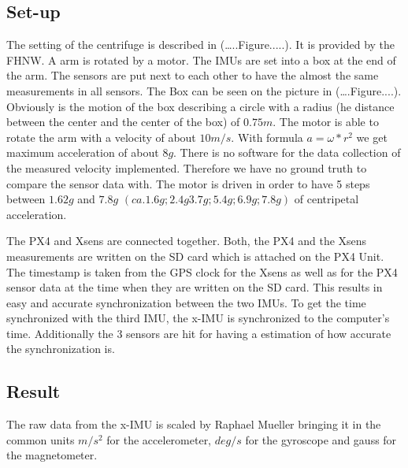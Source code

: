 \begin{description}
\subsection{Set-up}
The setting of the centrifuge is described in (…..Figure.....). It is provided by the FHNW. A arm is rotated by a motor. The IMUs are set into a box at the end of the arm. The sensors are put next to each other to have the almost the same measurements in all sensors. The Box can be seen on the picture in (….Figure....). Obviously is the motion of the box describing a circle with a radius (he distance between the center and the  center of the box) of $0.75 m$. The motor is able to rotate the arm with a velocity of about $10 m/s$. With formula $a=\omega*r^2$ we get maximum acceleration of about $8 g$. There is no software for the data collection of the measured velocity implemented. Therefore we have no ground truth to compare the sensor data with. The motor is driven in order to have 5 steps between $1.62 g$ and $7.8 g$ $(ca. 1.6 g; 2.4 g 3.7 g; 5.4 g; 6.9 g; 7.8 g)$ of centripetal acceleration.

The PX4 and Xsens are connected together. Both, the PX4 and the Xsens measurements are written on the SD card which is attached on the PX4 Unit. The timestamp is taken from the GPS clock for the Xsens as well as for the PX4 sensor data at the time when they are written on the SD card. This results in easy and accurate synchronization between the two IMUs. To get the time synchronized with the third IMU, the x-IMU is synchronized to the computer's time. Additionally the 3 sensors are hit for having a estimation of how accurate the synchronization is.
\subsection{Result}
The raw data from the x-IMU is scaled by Raphael Mueller bringing it in the common units $m/s^2$ for the accelerometer, $deg/s$ for the gyroscope and gauss for the magnetometer.


\end{description}
